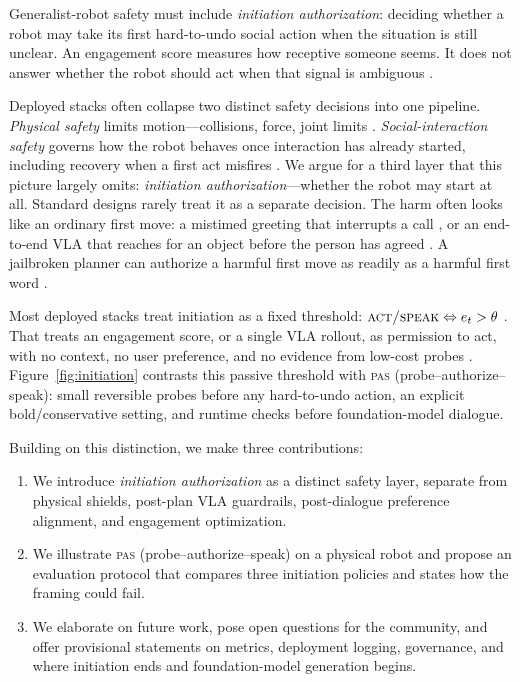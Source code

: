 Generalist-robot safety must include \emph{initiation
authorization}: deciding whether a robot may take its first
hard-to-undo social action when the situation is still unclear. An
engagement score measures how receptive someone seems. It does not
answer whether the robot should act when that signal is ambiguous
\citep{rich2010,broek2024proactive,shi2011spatial}.

Deployed stacks often collapse two distinct safety decisions into
one pipeline. \emph{Physical safety} limits motion---collisions,
force, joint limits \citep{zhang2025safevla}.
\emph{Social-interaction safety} governs how the robot behaves once
interaction has already started, including recovery when a first act
misfires \citep{akalin2021,tian2021socialerrors,harland2025aiapology}.
We argue for a third layer that this picture largely omits:
\emph{initiation authorization}---whether the robot may start at all.
Standard designs rarely treat it as a separate decision. The harm
often looks like an
ordinary first move: a mistimed greeting that interrupts a call
\citep{edirisinghe2024shopworker}, or an end-to-end VLA that reaches
for an object before the person has agreed
\citep{openvla-2024}. A jailbroken planner can
authorize a harmful first move as readily as a harmful first word
\citep{robey2024jailbreaking}.

Most deployed stacks treat initiation as a fixed threshold:
$\textsc{act/speak} \Leftrightarrow e_t > \theta$
\citep{bohus2014}. That treats an engagement score, or a single VLA
rollout, as permission to act, with no context, no user preference,
and no evidence from low-cost probes
\citep{skantze2014speech,bohus2014}.
Figure~\ref{fig:initiation} contrasts this passive threshold with
\textsc{pas} (probe--authorize--speak): small reversible probes
before any hard-to-undo action, an explicit bold/conservative setting,
and runtime checks before foundation-model dialogue.



Building on this distinction, we make three contributions:
\begin{enumerate}
\item We introduce \emph{initiation authorization} as a distinct safety
layer, separate from physical shields, post-plan VLA guardrails,
post-dialogue preference alignment, and engagement optimization.
\item We illustrate \textsc{pas} (probe--authorize--speak) on a physical
robot and propose an evaluation protocol that compares three
initiation policies and states how the framing could fail.
\item We elaborate on future work, pose open questions for the community,
and offer provisional statements on metrics, deployment logging,
governance, and where initiation ends and foundation-model generation
begins.
\end{enumerate}

